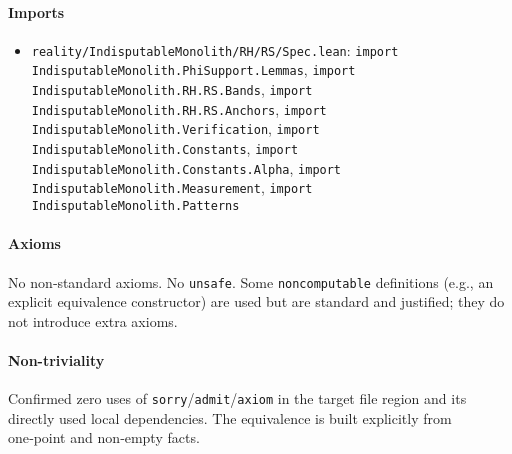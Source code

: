 \documentclass{article}
\newcommand{\FileRef}[1]{\texttt{#1}}
\begin{document}
\paragraph{Imports}
\begin{itemize}[leftmargin=*]
  \item \FileRef{reality/IndisputableMonolith/RH/RS/Spec.lean}: \texttt{import IndisputableMonolith.PhiSupport.Lemmas}, \texttt{import IndisputableMonolith.RH.RS.Bands}, \texttt{import IndisputableMonolith.RH.RS.Anchors}, \texttt{import IndisputableMonolith.Verification}, \texttt{import IndisputableMonolith.Constants}, \texttt{import IndisputableMonolith.Constants.Alpha}, \texttt{import IndisputableMonolith.Measurement}, \texttt{import IndisputableMonolith.Patterns}
\end{itemize}

\paragraph{Axioms}
No non‑standard axioms. No \texttt{unsafe}. Some \texttt{noncomputable} definitions (e.g., an explicit equivalence constructor) are used but are standard and justified; they do not introduce extra axioms.

\paragraph{Non-triviality}
Confirmed zero uses of \texttt{sorry}/\texttt{admit}/\texttt{axiom} in the target file region and its directly used local dependencies. The equivalence is built explicitly from one‑point and non‑empty facts.
\end{document}
